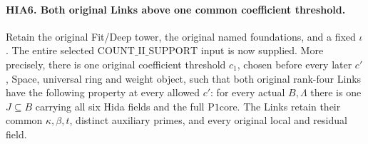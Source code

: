 \documentclass[11pt,a4paper]{article}
\numberwithin{equation}{section}
\theoremstyle{remark}\newtheorem{remark}[theorem]{Remark}
\begin{document}
\paragraph{HIA6. Both original Links above one common coefficient threshold.}
\label{claim:HIA6}
Retain the original Fit/Deep tower, the original named
foundations, and a fixed \(\iota\).  The entire selected
\(\mathrm{COUNT\_\allowbreak II\_\allowbreak SUPPORT}\) input is now supplied.
More precisely, there is one original coefficient threshold
\(c_1\), chosen before every later \(c'\), Space,
universal ring and weight object, such that both original
rank-four Links have the following property at every
allowed \(c'\): for every actual \(B,\Lambda\) there
is one \(J\subseteq B\) carrying all six Hida fields
and the full \(\mathrm{P1core}\).  The Links retain
their common \(\kappa,\beta,t\), distinct auxiliary
primes, and every original local and residual field.
\end{document}
